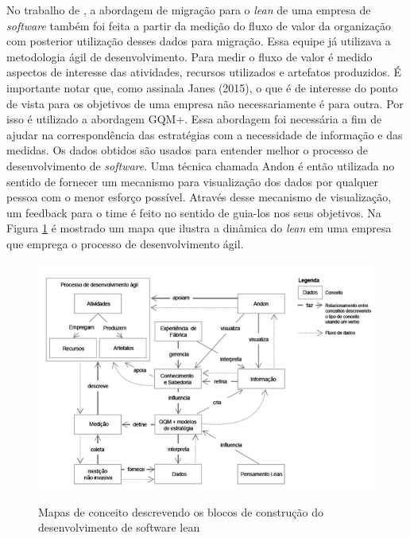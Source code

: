 No trabalho de , a abordagem de migração para o \textit{lean} de uma empresa de \textit{software} também foi feita a partir da medição do fluxo de valor da organização com posterior utilização desses dados para migração. Essa equipe já utilizava a metodologia ágil de desenvolvimento. Para medir o fluxo de valor é medido aspectos de interesse das atividades, recursos utilizados e artefatos produzidos. É importante notar que, como assinala Janes (2015), o que é de interesse do ponto de vista para os objetivos de uma empresa não necessariamente é para outra. Por isso é utilizado a abordagem GQM+. Essa abordagem foi necessária a fim de ajudar na correspondência das estratégias com a necessidade de informação e das medidas. Os dados obtidos são usados para entender melhor o processo de desenvolvimento de \textit{software}. Uma técnica chamada Andon é então utilizada no sentido de fornecer um mecanismo para visualização dos dados por qualquer pessoa com o menor esforço possível. Através desse mecanismo de visualização, um feedback para o time  é feito no sentido de guia-los nos seus objetivos. Na Figura \ref{fig:01} é mostrado um mapa que ilustra a dinâmica do \textit{lean} em uma empresa que emprega o processo de desenvolvimento ágil. 

\begin{figure}
\begin{center}
\caption{Mapas de conceito descrevendo os blocos de construção do desenvolvimento de software lean}
\label{fig:01}
\includegraphics[width=13cm]{assets/figura1} \\
\end{center}
\end{figure}


